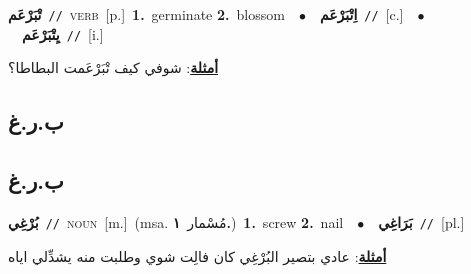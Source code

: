 \documentclass[10pt,a4paper,twoside]{article} %
\begin{document}
\begin{multicols}{2}
{\setlength\topsep{0pt}\textbf{\foreignlanguage{arabic}{تْبَرْعَم}}\ {\color{gray}\texttt{//}\color{black}}\ \textsc{verb}\ [p.]\ \textbf{1.}~germinate  \textbf{2.}~blossom\ \ $\bullet$\ \ \setlength\topsep{0pt}\textbf{\foreignlanguage{arabic}{اِتْبَرْعَم}}\ {\color{gray}\texttt{//}\color{black}}\ [c.]\ \ $\bullet$\ \ \setlength\topsep{0pt}\textbf{\foreignlanguage{arabic}{يِتْبَرْعَم}}\ {\color{gray}\texttt{//}\color{black}}\ [i.]\  \begin{flushright}\color{gray}\foreignlanguage{arabic}{\textbf{\underline{\foreignlanguage{arabic}{أمثلة}}}: شوفي كيف تْبَرْعَمت البطاطا؟}\end{flushright}\color{black}} \vspace{2mm}

\vspace{-3mm}
\subsection*{\color{blue}\foreignlanguage{arabic}{ب.ر.غ}\color{blue}{}} 

\vspace{-3mm}
\subsection*{\color{blue}\foreignlanguage{arabic}{ب.ر.غ}\color{blue}{ (ntws)}} 

{\setlength\topsep{0pt}\textbf{\foreignlanguage{arabic}{بُرْغِي}}\ {\color{gray}\texttt{//}\color{black}}\ \textsc{noun}\ [m.]\ \color{gray}(msa. \foreignlanguage{arabic}{مُسْمار}~\foreignlanguage{arabic}{\textbf{١.}})\color{black}\ \textbf{1.}~screw  \textbf{2.}~nail\ \ $\bullet$\ \ \setlength\topsep{0pt}\textbf{\foreignlanguage{arabic}{بَرَاغِي}}\ {\color{gray}\texttt{//}\color{black}}\ [pl.]\  \begin{flushright}\color{gray}\foreignlanguage{arabic}{\textbf{\underline{\foreignlanguage{arabic}{أمثلة}}}: عادي بتصير البُرْغِي كان فالِت شوي وطلبت منه يشدِّلي اياه}\end{flushright}\color{black}} \vspace{2mm}


\end{multicols}
\end{document}
